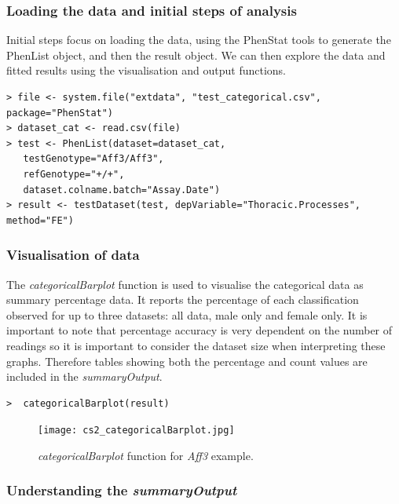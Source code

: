 \documentclass[12pt,a4paper]{article}
\begin{document}
\subsubsection{Loading the data and initial steps of analysis}
Initial steps focus on loading the data, using the PhenStat tools to generate the PhenList object, and then the result object.  We can then explore the data and fitted results using the visualisation and output functions.   

\begingroup
    \fontsize{8pt}{12pt}\selectfont
\begin{verbatim}
> file <- system.file("extdata", "test_categorical.csv", package="PhenStat") 
> dataset_cat <- read.csv(file)
> test <- PhenList(dataset=dataset_cat, 
   testGenotype="Aff3/Aff3", 
   refGenotype="+/+", 
   dataset.colname.batch="Assay.Date")
> result <- testDataset(test, depVariable="Thoracic.Processes", method="FE")
\end{verbatim}
\endgroup 

\subsubsection{Visualisation of data}
The \textit{categoricalBarplot} function is used to visualise the categorical data as summary percentage data. 
It reports the percentage of each classification observed for up to three datasets: all data, male only and female only.  
It is important to note that percentage accuracy is very dependent on the number of readings so it is important to consider the dataset size when interpreting these graphs.  
Therefore tables showing both the percentage and count values are included in the \textit{summaryOutput}. 

\begingroup
    \fontsize{8pt}{12pt}\selectfont
\begin{verbatim}
>  categoricalBarplot(result)
\end{verbatim}
\endgroup 

\begin{figure}[H]%
\centerline{\texttt{[image: cs2\_categoricalBarplot.jpg]}}
\caption{\textit{categoricalBarplot} function for \textit{Aff3} example.}\label{fig:24}
\end{figure}

\subsubsection{Understanding the \textit{summaryOutput}}
\end{document}
